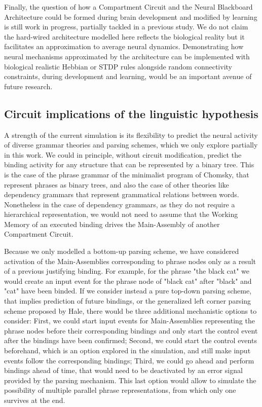 \documentclass[10pt]{article}
\begin{document}
Finally, the question of how a Compartment Circuit and the Neural Blackboard Architecture could be formed during brain development and modified by learning is still work in progress, partially tackled in a previous study\cite{van_der_Velde_2011}.
We do not claim the hard-wired architecture modelled here reflects the biological reality but it facilitates an approximation to average neural dynamics.
Demonstrating how neural mechanisms approximated by the architecture can be implemented with biological realistic Hebbian or STDP rules alongside random connectivity constraints, during development and learning, would be an important avenue of future research.

\subsection{Circuit implications of the linguistic hypothesis}
\label{discussion-linguistics}

A strength of the current simulation is its flexibility to predict the neural activity of diverse grammar theories and parsing schemes, which we only explore partially in this work.
We could in principle, without circuit modification, predict the binding activity for any structure that can be represented by a binary tree.
This is the case of the phrase grammar of the minimalist program of Chomsky\cite{Chomsky_2014}, that represent phrases as binary trees, and also the case of other theories like dependency grammars\cite{nivre2005dependency} that represent grammatical relations between words.
Nonetheless in the case of dependency grammars, as they do not require a hierarchical representation, we would not need to assume that the Working Memory of an executed binding drives the Main-Assembly of another Compartment Circuit.

Because we only modelled a bottom-up parsing scheme, we have considered activation of the Main-Assemblies corresponding to phrase nodes only as a result of a previous justifying binding.
For example, for the phrase "the black cat" we would create an input event for the phrase node of "black cat" after "black" and "cat" have been binded.
If we consider instead a pure top-down parsing scheme, that implies prediction of future bindings, or the generalized left corner parsing scheme proposed by Hale\cite{hale2014automaton}, there would be three additional mechanistic options to consider:
First, we could start input events for Main-Assemblies representing the phrase nodes before their corresponding bindings and only start the control event after the bindings have been confirmed;
Second, we could start the control events beforehand, which is an option explored in the simulation, and still make input events follow the corresponding bindings;
Third, we could go ahead and perform bindings ahead of time, that would need to be deactivated by an error signal provided by the parsing mechanism.
This last option would allow to simulate the possibility of multiple parallel phrase representations, from which only one survives at the end.
\end{document}
